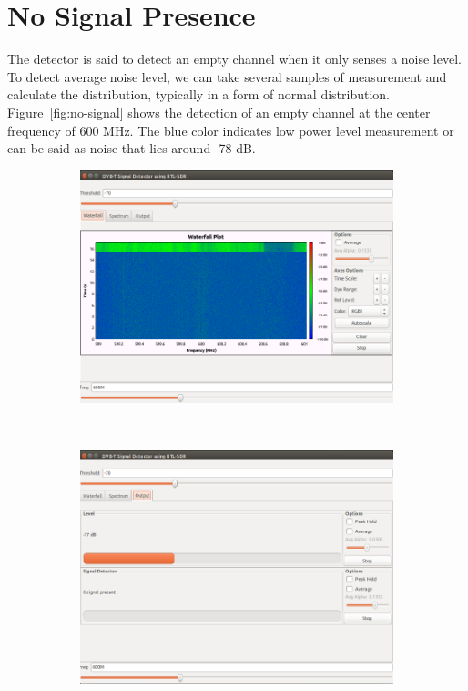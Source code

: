 \section{No Signal Presence}

The detector is said to detect an empty channel when it only senses a noise level. To detect average noise level, we can take several samples of measurement and calculate the distribution, typically in a form of normal distribution. Figure~\ref{fig:no-signal} shows the detection of an empty channel at the center frequency of 600 MHz. The blue color indicates low power level measurement or can be said as noise that lies around -78 dB. 

\begin{figure}[H]
    \centering
    \begin{subfigure}[b]{0.45\textwidth}
        \includegraphics[width=\textwidth]{figures/no-signal-1}
    \end{subfigure}
    ~ %
    \begin{subfigure}[b]{0.45\textwidth}
        \includegraphics[width=\textwidth]{figures/no-signal-2}

\end{subfigure}
\end{figure}
